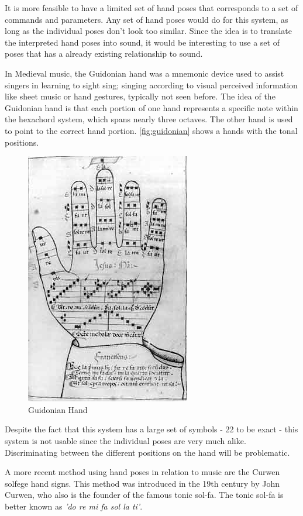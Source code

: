 It is more feasible to have a limited set of hand poses that corresponds to a set of commands and parameters.  Any set of hand poses would do for this system, as long as the individual poses don't look too similar. Since the idea is to translate the interpreted hand poses into sound, it would be interesting to use a set of poses that has a already existing relationship to sound.

In Medieval music, the Guidonian hand was a mnemonic device used to assist singers in learning to sight sing; singing according to visual perceived information like sheet music or hand gestures, typically not seen before. The idea of the Guidonian hand is that each portion of one hand represents a specific note within the hexachord system, which spans nearly three octaves. The other hand is used to point to the correct hand portion. \autoref{fig:guidonian} shows a hands with the tonal positions.

\begin{figure}[tb]
	\centering{}
	\includegraphics[width=0.3\linewidth]{figures/guidonian_hand.jpg}
	\caption{Guidonian Hand}
	\label{fig:guidonian}
\end{figure}

Despite the fact that this system has a large set of symbols - 22 to be exact - this system is not usable since the individual poses are very much alike. Discriminating between the different positions on the hand will be problematic.

A more recent method using hand poses in relation to music are the Curwen solfege hand signs\citep{choksy1999}. This method was introduced in the 19th century by John Curwen, who also is the founder of the famous tonic sol-fa. The tonic sol-fa is better known as \emph{'do re mi fa sol la ti'}.


